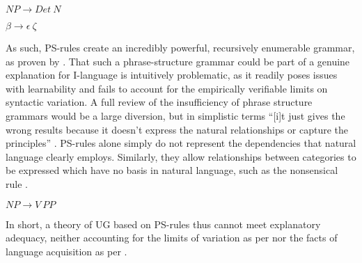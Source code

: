 \begin{subexamples}\label{ex:PSrulearb2}
\item\label{ex:PSrulearb21} $NP\rightarrow Det\ N$
\item\label{ex:PSrulearb22} $\beta\rightarrow \epsilon\ \zeta$
\end{subexamples}
%
As such, PS-rules create an incredibly powerful, recursively enumerable grammar, as proven by \textcite{PostEL_1944,PostEL_1947}. That such a phrase-structure grammar could be part of a genuine explanation for I-language is intuitively problematic, as it readily poses issues with learnability and fails to account for the empirically verifiable limits on syntactic variation. A full review of the insufficiency of phrase structure grammars would be a large diversion, but in simplistic terms ``[i]t just gives the wrong results because it doesn't express the natural relationships or capture the principles'' \parencite{ChomskyN_2009}. PS-rules alone simply do not represent the dependencies that natural language clearly employs. Similarly, they allow relationships between categories to be expressed which have no basis in natural language, such as the nonsensical rule .

\begin{example}\label{ex:PSrulecrazy}
    $NP\rightarrow V\ PP$
\end{example}
\noindent
In short, a theory of UG based on PS-rules thus cannot meet explanatory adequacy, neither accounting for the limits of variation as per  nor the facts of language acquisition as per .
